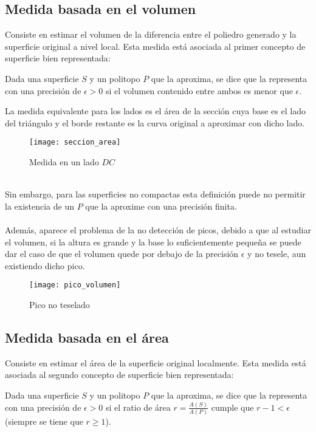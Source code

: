 	\subsection{Medida basada en el volumen}
	
	Consiste en estimar el volumen de la diferencia entre el poliedro generado y la superficie original a nivel local. Esta medida está asociada al primer concepto de superficie bien representada:
	\begin{definicion}
		Dada una superficie $S$ y un politopo $P$ que la aproxima, se dice que la representa con una precisión de $\epsilon > 0$ si el volumen contenido entre ambos es menor que $\epsilon$.
	\end{definicion}
	La medida equivalente para los lados es el área de la sección cuya base es el lado del triángulo y el borde restante es la curva original a aproximar con dicho lado.\\ 
	\begin{figure}[h]
  		\centering
  		\texttt{[image: seccion\_area]}
  		\caption{Medida en un lado $DC$}
  		\label{fig:seccion_area}
	\end{figure}
	\\ Sin embargo, para las superficies no compactas esta definición puede no permitir la existencia de un $P$ que la aproxime con una precisión finita.\\
	\\ Además, aparece el problema de la no detección de picos, debido a que al estudiar el volumen, si la altura es grande y la base lo suficientemente pequeña se puede dar el caso de que el volumen quede por debajo de la precisión $\epsilon$ y no tesele, aun existiendo dicho pico.
	\begin{figure}[h]
  		\centering
  		\texttt{[image: pico\_volumen]}
  		\caption{Pico no teselado}
  		\label{fig:pico_volumen}
	\end{figure}
	
	\subsection{Medida basada en el área}
	
	Consiste en estimar el área de la superficie original localmente. Esta medida está asociada al segundo concepto de superficie bien representada:
	\begin{definicion}
		Dada una superficie $S$ y un politopo $P$ que la aproxima, se dice que la representa con una precisión de $\epsilon > 0$ si el ratio de área $r=\frac{A(S)} {A(P)}$ cumple que $r-1 < \epsilon$ (siempre se tiene que $r\geq 1$).
	\end{definicion}
	
